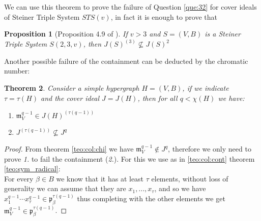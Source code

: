 \documentclass[notitlepage, a4]{book}
\theoremstyle{plain}
\newtheorem{teo}{Theorem}[section]
\newtheorem{prop}[teo]{Proposition}
\theoremstyle{remark}
\theoremstyle{definition}
\newcommand{\p}{\mathfrak{p}}
\newcommand{\mm}{\mathfrak{m}}
\newcounter{que}
\begin{document}
We can use this theorem to prove the failure of Question \ref{que:32} for cover ideals of Steiner Triple System $ STS(v) $, in fact it is enough to prove that 
\begin{prop}[Proposition 4.9 of \cite{Bal21Steiner}]
If $ v>3 $ and $ S = (V,B) $ is a Steiner Triple System $ S(2,3,v) $, then $ J(S)^{(3)}  \not \subseteq J(S)^2$
\end{prop}




Another possible failure of the containment can be deducted by the chromatic number:

\begin{teo} \label{teo:borin1}
	Consider a simple hypergraph $H = (V,B)$, if we indicate $\tau = \tau (H)$ and the cover ideal $ J = J(H)$,  then for all $ q < \chi(H)$ we have: 
	\begin{enumerate}
	\item $ \mm_V^{q-1} \in J(H)^{( \tau (q-1) )} $
	\item $ J^{( \tau(q-1) )} \not \subseteq J^q $
	\end{enumerate}
\end{teo}


\begin{proof}
	From theorem \ref{teo:col:chi} we have $\mm_V^{q-1} \not \in J^q$, therefore we only need to prove \textit{1.} to fail the containment (\textit{2.}). For this we use as in \ref{teo:col:cont} theorem \ref{teo:sym_radical}:\\
	For every $\beta \in B $ we know that it has at least $	\tau$ elements, without loss of generality we can assume that they are $x_1 , ... , x_\tau$, and so we have $x_1^{q-1} \cdots  x_\tau^{q-1} \in \p_\beta^{\tau(q -1)} $ thus completing with the other elements we get $\mm_V^{q-1} \in \p_\beta^{\tau(q -1)} $. 
\end{proof} 


\backmatter
\printbibliography
\end{document}
